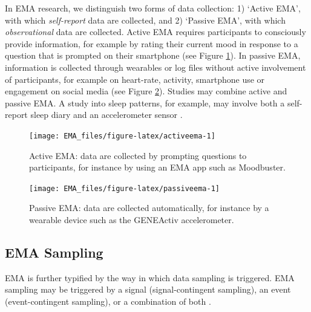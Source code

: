 \documentclass[]{book}
\begin{document}
 
 

In EMA research, we distinguish two forms of data collection: 1) `Active
EMA', with which \emph{self-report} data are collected, and 2) `Passive
EMA', with which \emph{observational} data are collected. Active EMA
requires participants to consciously provide information, for example by
rating their current mood in response to a question that is prompted on
their smartphone (see Figure \ref{fig:activeema}). In passive EMA,
information is collected through wearables or log files without active
involvement of participants, for example on heart-rate, activity,
smartphone use or engagement on social media (see Figure
\ref{fig:passiveema}). Studies may combine active and passive EMA. A
study into sleep patterns, for example, may involve both a self-report
sleep diary and an accelerometer sensor \citep{Meijden2016}.

\begin{figure}

{\centering \texttt{[image: EMA\_files/figure-latex/activeema-1]} 

}

\caption{Active EMA: data are collected by prompting questions to participants, for instance by using an EMA app such as Moodbuster. }\label{fig:activeema}
\end{figure}

\begin{figure}

{\centering \texttt{[image: EMA\_files/figure-latex/passiveema-1]} 

}

\caption{Passive EMA: data are collected automatically, for instance by a wearable device such as the GENEActiv accelerometer.}\label{fig:passiveema}
\end{figure}

\subsection{EMA Sampling}\label{ema-sampling}

 

EMA is further typified by the way in which data sampling is triggered.
EMA sampling may be triggered by a signal (signal-contingent sampling),
an event (event-contingent sampling), or a combination of both
\citep{Conner2012b}.
\end{document}
